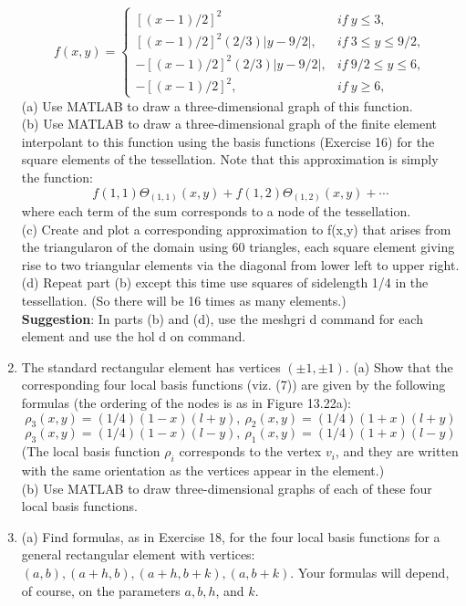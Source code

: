 \documentclass[../main.tex]{subfiles}
\begin{document}
\begin{enumerate}
$$f(x,y)=\left\{\begin{matrix}
[(x-1)/2]^2 & if~y\leq 3,\\ 
[(x-1)/2]^2 (2/3)|y-9/2|,&if~ 3\leq y \leq 9/2, \\ 
-[(x-1)/2]^2 (2/3)|y-9/2|, & if~9/2\leq y\leq 6, \\ 
-[(x-1)/2]^2, & if~y\geq 6,
\end{matrix}\right.$$
(a) Use MATLAB to draw a three-dimensional graph of this function.
\\ 
(b) Use MATLAB to draw a three-dimensional graph of the finite element interpolant to this 
function using the basis functions (Exercise 16) for the square elements of the tessellation. Note 
that this approximation is simply the function:
\\
$$f(1,1)\Theta_{(1,1)}(x,y)+f(1,2)\Theta_{(1,2)}(x,y)+\cdots$$
where each term of the sum corresponds to a node of the tessellation.
\\ 
(c) Create and plot a corresponding approximation to f(x,y) that arises from the triangularon of 
the domain using 60 triangles, each square element giving rise to two triangular elements via the 
diagonal from lower left to upper right.
\\ 
(d) Repeat part (b) except this time use squares of sidelength 1/4 in the tessellation. (So there 
will be 16 times as many elements.)
\\ 
\textbf{Suggestion}: In parts (b) and (d), use the meshgri d command for each element and use the 
hol d on command. 
	\item The standard rectangular element has vertices $(\pm1,\pm1)$. (a) Show that the corresponding four 
local basis functions (viz. (7)) are given by the following formulas (the ordering of the nodes is 
as in Figure 13.22a):
\\
$$\rho_3(x,y) = (1/4)(1-x)(l+y), ~\rho_2(x,y) = (1/4)(1+x)(l+y)$$
$$\rho_3(x,y) = (1/4)(1-x)(l-y), ~\rho_1(x,y) = (1/4)(1+x)(l-y)$$
(The local basis function $\rho_i$ corresponds to the vertex $v_i$, and they are written with the same orientation as the vertices appear in the element.) 
\\
(b) Use MATLAB to draw three-dimensional graphs of each of these four local basis functions. 
	\item (a) Find formulas, as in Exercise 18, for the four local basis functions for a general rectangular element with vertices: $(a, b),(a+h, b),(a+h, b+k),(a, b+k)$. Your formulas will depend, of course, on the parameters $a, b, h$, and $k$.

\end{enumerate}
\end{document}
